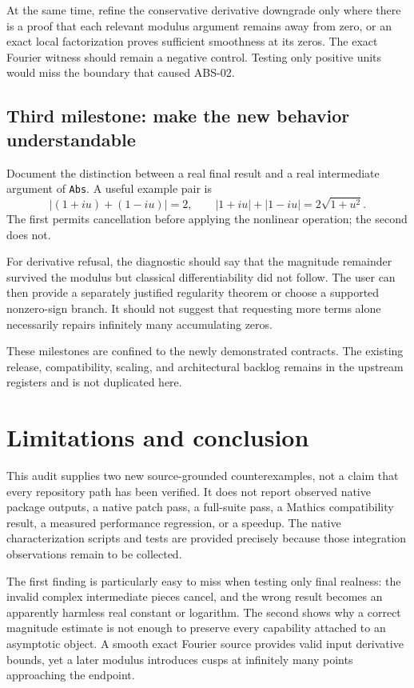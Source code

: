 \documentclass[11pt,a4paper]{article}
\newcommand{\code}[1]{\nolinkurl{#1}}
\begin{document}
At the same time, refine the conservative derivative downgrade only where there is a proof that each relevant modulus argument remains away from zero, or an exact local factorization proves sufficient smoothness at its zeros. The exact Fourier witness should remain a negative control. Testing only positive units would miss the boundary that caused ABS-02.

\subsection{Third milestone: make the new behavior understandable}

Document the distinction between a real final result and a real intermediate argument of \code{Abs}. A useful example pair is
\[
 \left|(1+i u)+(1-i u)\right|=2,
 \qquad |1+i u|+|1-i u|=2\sqrt{1+u^2}.
\]
The first permits cancellation before applying the nonlinear operation; the second does not.

For derivative refusal, the diagnostic should say that the magnitude remainder survived the modulus but classical differentiability did not follow. The user can then provide a separately justified regularity theorem or choose a supported nonzero-sign branch. It should not suggest that requesting more terms alone necessarily repairs infinitely many accumulating zeros.

These milestones are confined to the newly demonstrated contracts. The existing release, compatibility, scaling, and architectural backlog remains in the upstream registers and is not duplicated here.

\section{Limitations and conclusion}

This audit supplies two new source-grounded counterexamples, not a claim that every repository path has been verified. It does not report observed native package outputs, a native patch pass, a full-suite pass, a Mathics compatibility result, a measured performance regression, or a speedup. The native characterization scripts and tests are provided precisely because those integration observations remain to be collected.

The first finding is particularly easy to miss when testing only final realness: the invalid complex intermediate pieces cancel, and the wrong result becomes an apparently harmless real constant or logarithm. The second shows why a correct magnitude estimate is not enough to preserve every capability attached to an asymptotic object. A smooth exact Fourier source provides valid input derivative bounds, yet a later modulus introduces cusps at infinitely many points approaching the endpoint.
\end{document}
